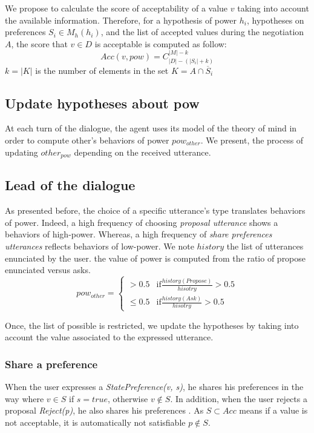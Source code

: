 \documentclass[sigconf]{aamas}  %
\begin{document}
	We propose to calculate the score of acceptability of a value $v$ taking into account the available information. Therefore, for a hypothesis of power $h_i$, hypotheses on preferences $S_i \in M_h(h_i)$,  and the list of accepted values during the negotiation $A$, the score that $v \in D$ is acceptable is computed as follow: 
	\begin{equation}
	Acc(v, pow) = C_{|D|-(|S_i| + k)}^{|M| - k}
	\end{equation}
	$k = |K| $ is the number of elements in the set $K = A \cap \overline S_i$
	
	
	
	\subsection{Update hypotheses about pow}
	At each turn of the dialogue, the agent uses its model of the theory of mind in order to compute other's behaviors of power $pow_{other}$. We present, the process of updating $other_{pow}$ depending on the received utterance. 
	\subsection{Lead of the dialogue}		
	As presented before, the choice of a specific utterance's type translates behaviors of power. Indeed, a high frequency of choosing \emph{proposal utterance} shows a behaviors of high-power. Whereas, a high frequency of \emph{share preferences utterances} reflects behaviors of low-power.
	We note $history$ the list of utterances enunciated by the user. the value of power is computed from the ratio of propose enunciated versus asks.
	\begin{equation}
	pow_{other} = \left\{\begin{array}{ll}
	> 0.5 & \mathrm{if } \frac{history(Propose)}{hisotry} > 0.5\\
	\leq 0.5 & \mathrm{if  } \frac{history(Ask)}{hisotry} > 0.5
	\end{array}\right.
	\end{equation}
	
	Once, the list of possible is restricted, we update the hypotheses by taking into account the value associated to the expressed utterance.
	
	\subsubsection{Share a preference}
	When the user expresses a \emph{StatePreference(v, s)}, he shares his preferences in the way where $v \in S$ if $s =true$, otherwise $v \notin S$. 
	In addition, when the user rejects a proposal \emph{Reject(p)}, he also shares his preferences . As $S \subset Acc$ means if a value is not acceptable, it is automatically not satisfiable $p \notin S$. 
	
\end{document}
